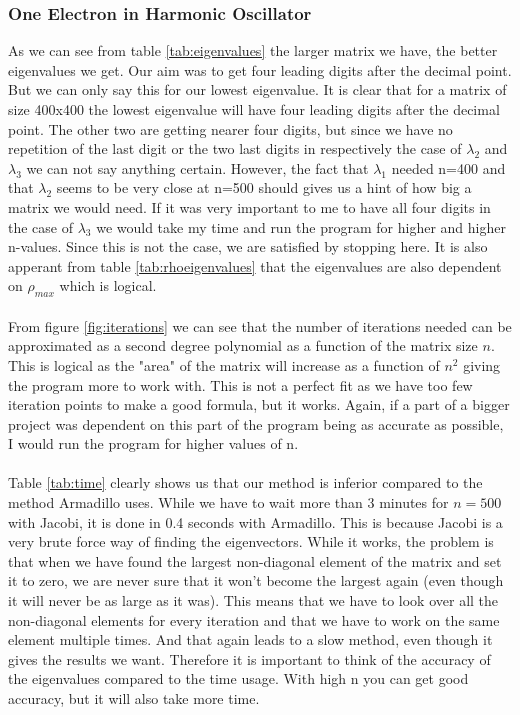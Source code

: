 \documentclass{article}
\begin{document}
\subsubsection{One Electron in Harmonic Oscillator}
As we can see from table \ref{tab:eigenvalues} the larger matrix we have, the better eigenvalues we get. Our aim was to get four leading digits after the decimal point. But we can only say this for our lowest eigenvalue. It is clear that for a matrix of size 400x400 the lowest eigenvalue will have four leading digits after the decimal point. The other two are getting nearer four digits, but since we have no repetition of the last digit or the two last digits in respectively the case of $\lambda_2$ and $\lambda_3$ we can not say anything certain. However, the fact that $\lambda_1$ needed n=400 and that $\lambda_2$ seems to be very close at n=500 should gives us a hint of how big a matrix we would need. If it was very important to me to have all four digits in the case of $\lambda_3$ we would take my time and run the program for higher and higher n-values. Since this is not the case, we are satisfied by stopping here.
It is also apperant from table \ref{tab:rhoeigenvalues} that the eigenvalues are also dependent on $\rho_{max}$ which is logical.\\ \\
From figure \ref{fig:iterations} we can see that the number of iterations needed can be approximated as a second degree polynomial as a function of the matrix size $n$. This is logical as the "area" of the matrix will increase as a function of $n^2$ giving the program more to work with. This is not a perfect fit as we have too few iteration points to make a good formula, but it works. Again, if a part of a bigger project was dependent on this part of the program being as accurate as possible, I would run the program for higher values of n. \\ \\
Table \ref{tab:time} clearly shows us that our method is inferior compared to the method Armadillo uses. While we have to wait more than 3 minutes for $n = 500$ with Jacobi, it is done in 0.4 seconds with Armadillo. This is because Jacobi is a very brute force way of finding the eigenvectors. While it works, the problem is that when we have found the largest non-diagonal element of the matrix and set it to zero, we are never sure that it won't become the largest again (even though it will never be as large as it was). This means that we have to look over all the non-diagonal elements for every iteration and that we have to work on the same element multiple times. And that again leads to a slow method, even though it gives the results we want. Therefore it is important to think of the accuracy of the eigenvalues compared to the time usage. With high n you can get good accuracy, but it will also take more time.
\end{document}

